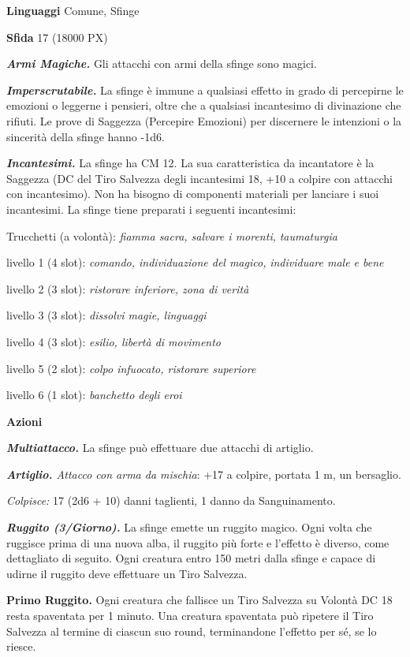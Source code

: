 \begin{multicols}{2}
\textbf{Linguaggi} Comune, Sfinge

\textbf{Sfida} 17 (18000 PX)

\textit{\textbf{Armi Magiche.}} Gli attacchi con armi della sfinge sono magici.

\textit{\textbf{Imperscrutabile.}} La sfinge è immune a qualsiasi effetto in grado di percepirne le emozioni o leggerne i pensieri, oltre che a qualsiasi incantesimo di divinazione che rifiuti. Le prove di Saggezza (Percepire Emozioni) per discernere le intenzioni o la sincerità della sfinge hanno -1d6.

\textit{\textbf{Incantesimi.}} La sfinge ha CM 12.
La sua caratteristica da incantatore è la Saggezza (DC del Tiro Salvezza degli incantesimi 18, +10 a colpire con attacchi con incantesimo). Non ha bisogno di componenti materiali per lanciare i suoi incantesimi. La sfinge tiene preparati i seguenti incantesimi:

Trucchetti (a volontà): \textit{fiamma sacra, salvare i morenti,} \textit{taumaturgia}

livello 1 (4 slot): \textit{comando, individuazione del magico,} \textit{individuare male e bene}

livello 2 (3 slot): \textit{ristorare inferiore, zona di verità}

livello 3 (3 slot): \textit{dissolvi magie, linguaggi}

livello 4 (3 slot): \textit{esilio, libertà di movimento}

livello 5 (2 slot): \textit{colpo infuocato, ristorare superiore}

livello 6 (1 slot): \textit{banchetto degli eroi}

\textbf{Azioni}

\textit{\textbf{Multiattacco.}} La sfinge può effettuare due attacchi di artiglio.

\textit{\textbf{Artiglio.} Attacco con arma da mischia}: +17 a colpire, portata 1 m, un bersaglio.

\textit{Colpisce:} 17 (2d6 + 10) danni taglienti, 1 danno da Sanguinamento.

\textit{\textbf{Ruggito (3/Giorno).}} La sfinge emette un ruggito magico. Ogni volta che ruggisce prima di una nuova alba, il ruggito più forte e l'effetto è diverso, come dettagliato di seguito. Ogni creatura entro 150 metri dalla sfinge e capace di udirne il ruggito deve effettuare un Tiro Salvezza.

\textbf{Primo Ruggito.} Ogni creatura che fallisce un Tiro Salvezza su Volontà DC 18 resta spaventata per 1 minuto. Una creatura spaventata può ripetere il Tiro Salvezza al termine di ciascun suo round, terminandone l'effetto per sé, se lo riesce.


\end{multicols}
